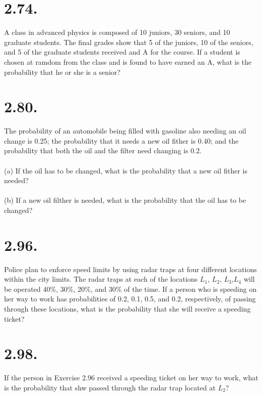 \documentclass[../main.tex]{subfiles}
\begin{document}
\vspace{15em}

\section{2.74.}
A class in advanced physics is composed of 10 juniors, 30 seniors, and 10 graduate students.
The final grades show that 5 of the juniors, 10 of the seniors, and 5 of the graduate students received and A for the course.
If a student is chosen at ramdom from the class and is found to have earned an A, what is the probability that 
he or she is a senior?

\vspace{15em}

\section{2.80.}
The probability of an automobile being filled with gasoline also needing an oil change
is 0.25; the probability that it needs a new oil fither is 0.40; and the probability that both the oil and the filter
need changing is 0.2.
\\\\
(a) If the oil has to be changed, what is the probability that a new oil fither is needed?
\\\\
(b) If a new oil filther is needed, what is the probability that the oil has to be changed?

\vspace{15em}

\section{2.96.}
Police plan to enforce speed limits by using radar traps at four different locations within
the city limits. The radar traps at each of the locations $L_1$, $L_2$, $L_3$,$L_4$
will be operated 40\%, 30\%, 20\%, and 30\% of the time. If a person who is speeding on her way to work has
probabilities of 0.2, 0.1, 0.5, and 0.2, respectively, of passing through these locations, what is
the probability that she will receive a speeding ticket?

\vspace{15em}

\section{2.98.}
If the person in Exercise 2.96 received a speeding ticket on her way to work, what is 
the probability that shw passed through the radar trap located at $L_2$?
\end{document}
